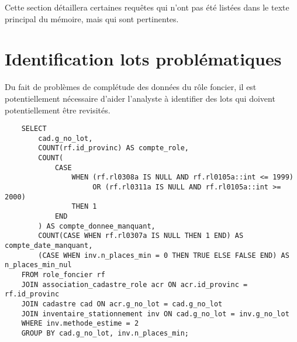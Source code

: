 Cette section détaillera certaines requêtes qui n'ont pas été listées dans le texte principal du mémoire, mais qui sont pertinentes.
\section{Identification lots problématiques}\label{sec:annexe_identification_lots_problématiques}
Du fait de problèmes de complétude des données du rôle foncier, il est potentiellement nécessaire d'aider l'analyste à identifier des lots qui doivent potentiellement être revisités.
\begin{lstlisting}
    SELECT
    	cad.g_no_lot,
    	COUNT(rf.id_provinc) AS compte_role,
    	COUNT(
    		CASE 
    			WHEN (rf.rl0308a IS NULL AND rf.rl0105a::int <= 1999)
    				 OR (rf.rl0311a IS NULL AND rf.rl0105a::int >= 2000)
    			THEN 1 
    		END
    	) AS compte_donnee_manquant,
    	COUNT(CASE WHEN rf.rl0307a IS NULL THEN 1 END) AS compte_date_manquant,
    	(CASE WHEN inv.n_places_min = 0 THEN TRUE ELSE FALSE END) AS n_places_min_nul
    FROM role_foncier rf
    JOIN association_cadastre_role acr ON acr.id_provinc = rf.id_provinc
    JOIN cadastre cad ON acr.g_no_lot = cad.g_no_lot
    JOIN inventaire_stationnement inv ON cad.g_no_lot = inv.g_no_lot
    WHERE inv.methode_estime = 2
    GROUP BY cad.g_no_lot, inv.n_places_min;
\end{lstlisting}

